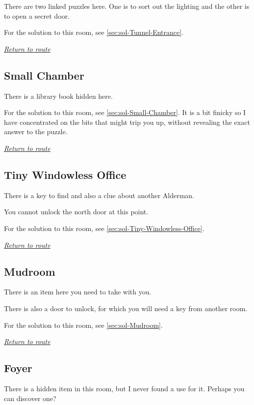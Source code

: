 \documentclass[a5paper]{extarticle}
\begin{document}
There are two linked puzzles here. One is to sort out the lighting and the
other is to open a secret door.

For the solution to this room, see \cref{sec:sol-Tunnel-Entrance}.

\hyperref[sec:route-5]{\emph{Return to route}}

\newpage
\subsection{Small Chamber}\label{sec:req-Small-Chamber}

There is a library book hidden here.

For the solution to this room, see \cref{sec:sol-Small-Chamber}.
It is a bit finicky so I have concentrated on the bits that might trip you up,
without revealing the exact answer to the puzzle.

\hyperref[sec:route-5]{\emph{Return to route}}

\newpage
\subsection{Tiny Windowless Office}\label{sec:req-Tiny-Windowless-Office}

There is a key to find and also a clue about another Alderman.

You cannot unlock the north door at this point.

For the solution to this room, see \cref{sec:sol-Tiny-Windowless-Office}.

\hyperref[sec:route-5]{\emph{Return to route}}

\newpage
\subsection{Mudroom}\label{sec:req-Mudroom}

There is an item here you need to take with you.

There is also a door to unlock, for which you will need a key from another room.

For the solution to this room, see \cref{sec:sol-Mudroom}.

\hyperref[sec:route-5]{\emph{Return to route}}

\newpage
\subsection{Foyer}\label{sec:req-Foyer}

There is a hidden item in this room, but I never found a use for it.
Perhaps you can discover one?
\end{document}
